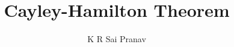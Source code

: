 \documentclass[journal,12pt,twocolumn]{IEEEtran}
\begin{document}
\makeatletter
{}
\makeatother
\let\StandardTheFigure\thefigure
\let\vec\mathbf
\renewcommand{\thefigure}{\theproblem}
\def\putbox#1#2#3{\makebox[0in][l]{\makebox[#1][l]{}\raisebox{\baselineskip}[0in][0in]{\raisebox{#2}[0in][0in]{#3}}}}
     \def\rightbox#1{\makebox[0in][r]{#1}}
     \def\centbox#1{\makebox[0in]{#1}}
     \def\topbox#1{\raisebox{-\baselineskip}[0in][0in]{#1}}
     \def\midbox#1{\raisebox{-0.5\baselineskip}[0in][0in]{#1}}
\vspace{3cm}
\title{Cayley-Hamilton Theorem}
\author{K R Sai Pranav}
%
%
%
% 
%
\end{document}
